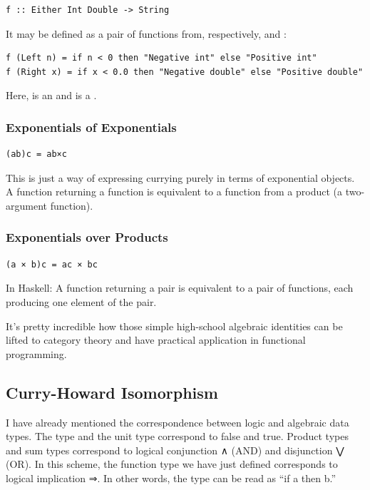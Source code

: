 \begin{verbatim}
f :: Either Int Double -> String
\end{verbatim}

It may be defined as a pair of functions from, respectively,
 and :

\begin{verbatim}
f (Left n) = if n < 0 then "Negative int" else "Positive int"
f (Right x) = if x < 0.0 then "Negative double" else "Positive double"
\end{verbatim}

Here,  is an  and  is a .

\subsubsection{Exponentials of
Exponentials}\label{exponentials-of-exponentials}

\begin{verbatim}
(ab)c = ab×c
\end{verbatim}

This is just a way of expressing currying purely in terms of exponential
objects. A function returning a function is equivalent to a function
from a product (a two-argument function).

\subsubsection{Exponentials over
Products}\label{exponentials-over-products}

\begin{verbatim}
(a × b)c = ac × bc
\end{verbatim}

In Haskell: A function returning a pair is equivalent to a pair of
functions, each producing one element of the pair.

It's pretty incredible how those simple high-school algebraic identities
can be lifted to category theory and have practical application in
functional programming.

\subsection{Curry-Howard Isomorphism}\label{curry-howard-isomorphism}

I have already mentioned the correspondence between logic and algebraic
data types. The  type and the unit type \code{()}
correspond to false and true. Product types and sum types correspond to
logical conjunction ∧ (AND) and disjunction ⋁ (OR). In this scheme, the
function type we have just defined corresponds to logical implication ⇒.
In other words, the type  can be read as ``if
a then b.''

